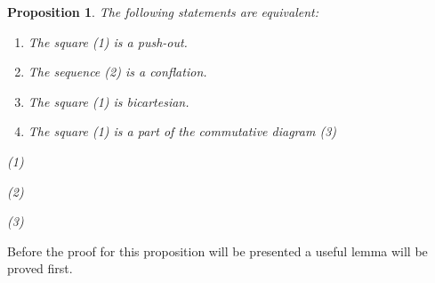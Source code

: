 \documentclass[12pt]{article}
\newtheorem{prop}[theorem]{Proposition}
\theoremstyle{definition}
\theoremstyle{remark}
\begin{document}
            \begin{prop} 
                The following statements are equivalent:
                \begin{enumerate}
                    \item The square (1) is a push-out.
                    \item The sequence (2) is a conflation.
                    \item The square (1) is bicartesian.
                    \item The square (1) is a part of the commutative diagram (3)
                \end{enumerate}
                \begin{center}
                    (1)
                    \space (2)
                    \space (3)
                \end{center}
            \end{prop}

            Before the proof for this proposition will be presented a useful lemma will be proved first.
\end{document}
